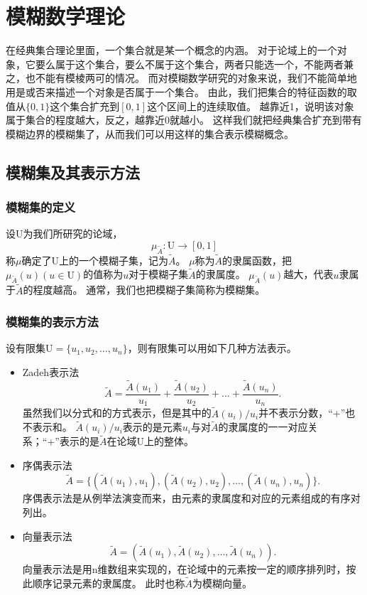 \chapter[模糊数学理论]{模糊数学理论}
\par
在经典集合理论里面，一个集合就是某一个概念的内涵。
对于论域上的一个对象，它要么属于这个集合，要么不属于这个集合，两者只能选一个，不能两者兼之，也不能有模棱两可的情况。
而对模糊数学研究的对象来说，我们不能简单地用是或否来描述一个对象是否属于一个集合。
由此，我们把集合的特征函数的取值从$\{0,1\}$这个集合扩充到$[0,1]$这个区间上的连续取值。
越靠近1，说明该对象属于集合的程度越大，反之，越靠近0就越小。
这样我们就把经典集合扩充到带有模糊边界的模糊集了，从而我们可以用这样的集合表示模糊概念。
\section{模糊集及其表示方法}
\subsection{模糊集的定义}
\begin{definition}
    设$\mathrm{U}$为我们所研究的论域，
    \[
        \mu_{\tilde{A}}: \mathrm{U} \longrightarrow[0,1]
    \]
    称$\mu$确定了$\mathrm{U}$上的一个模糊子集，记为$\tilde{A}$。
    $\mu$称为$\tilde{A}$的隶属函数，把$\mu_{\tilde{A}}(u)(u \in \mathrm{U})$的值称为$u$对于模糊子集$\tilde{A}$的隶属度。
    $\mu_{\tilde{A}}(u)$越大，代表$u$隶属于$\tilde{A}$的程度越高。
    通常，我们也把模糊子集简称为模糊集。
\end{definition}
\subsection{模糊集的表示方法}
设有限集$\mathrm{U}=\{u_1,u_2,\dots ,u_n\}$，则有限集可以用如下几种方法表示\cite{模糊数学李安贵}。
\begin{itemize}
    \item Zadeh表示法
          \[
              \tilde{A}=\frac{\tilde{A}(u_1)}{u_1}+\frac{\tilde{A}(u_2)}{u_2}+ \dots +\frac{\tilde{A}(u_n)}{u_n}.
          \]
          虽然我们以分式和的方式表示，但是其中的$\tilde{A}(u_i)/u_i$并不表示分数，“+”也不表示和。
          $\tilde{A}(u_i)/u_i$表示的是元素$u_i$与对$\tilde{A}$的隶属度的一一对应关系；“+”表示的是$\tilde{A}$在论域$\mathrm{U}$上的整体。
    \item 序偶表示法
          \[
              \tilde{A}=\{(\tilde{A}(u_1),u_1),(\tilde{A}(u_2),u_2),\dots ,(\tilde{A}(u_n),u_n)\}.
          \]
          序偶表示法是从例举法演变而来，由元素的隶属度和对应的元素组成的有序对列出。
    \item 向量表示法
          \[
              \tilde{A}=(\tilde{A}(u_1),\tilde{A}(u_2),\dots ,\tilde{A}(u_n)).
          \]
          向量表示法是用n维数组来实现的，在论域中的元素按一定的顺序排列时，按此顺序记录元素的隶属度。
          此时也称$\tilde{A}$为模糊向量。
\end{itemize}
